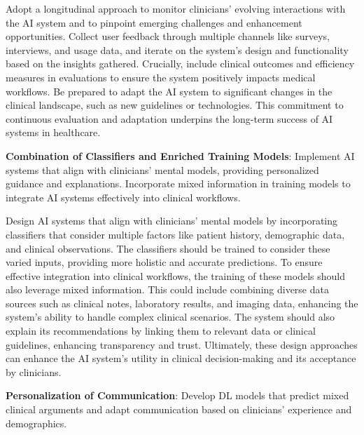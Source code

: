 \vspace{2.00mm}

Adopt a longitudinal approach to monitor clinicians' evolving interactions with the \ac{AI} system and to pinpoint emerging challenges and enhancement opportunities.
Collect user feedback through multiple channels like surveys, interviews, and usage data, and iterate on the system's design and functionality based on the insights gathered.
Crucially, include clinical outcomes and efficiency measures in evaluations to ensure the system positively impacts medical workflows.
Be prepared to adapt the \ac{AI} system to significant changes in the clinical landscape, such as new guidelines or technologies.
This commitment to continuous evaluation and adaptation underpins the long-term success of \ac{AI} systems in healthcare.

\noindent
{\bf Combination of Classifiers and Enriched Training Models}:
Implement \ac{AI} systems that align with clinicians' mental models, providing personalized guidance and explanations.
Incorporate mixed information in training models to integrate \ac{AI} systems effectively into clinical workflows.

\vspace{2.00mm}

Design \ac{AI} systems that align with clinicians' mental models by incorporating classifiers that consider multiple factors like patient history, demographic data, and clinical observations.
The classifiers should be trained to consider these varied inputs, providing more holistic and accurate predictions.
To ensure effective integration into clinical workflows, the training of these models should also leverage mixed information.
This could include combining diverse data sources such as clinical notes, laboratory results, and imaging data, enhancing the system's ability to handle complex clinical scenarios.
The system should also explain its recommendations by linking them to relevant data or clinical guidelines, enhancing transparency and trust.
Ultimately, these design approaches can enhance the \ac{AI} system's utility in clinical decision-making and its acceptance by clinicians.

\vspace{2.00mm}

\noindent
{\bf Personalization of Communication}: Develop \ac{DL} models that predict mixed clinical arguments and adapt communication based on clinicians' experience and demographics.

\vspace{2.00mm}

